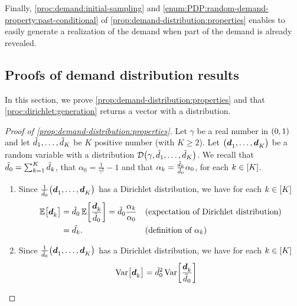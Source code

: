Finally, \cref{proc:demand:initial-sampling} and \cref{enum:PDP:random-demand-property:past-conditional} of \cref{prop:demand-distribution:properties} enables to easily generate a realization of the demand when part of the demand is already revealed.



\subsection{Proofs of demand distribution results}
\label{sec:PDP:numerical-experiments:instances:proofs}


In this section, we prove \cref{prop:demand-distribution:properties} and that \cref{proc:dirichlet:generation} returns a vector with a \distrib distribution.


\begin{proof}[Proof of \cref{prop:demand-distribution:properties}] 
Let $\gamma$ be a real number in $\bracket{0,1}$ and let $\tilde{d}_1,\ldots,\tilde{d}_K$ be $K$ positive number (with $K\ge2$).
Let $\bracket{\va\demand_1,\ldots,\va\demand_K}$ be a random variable with a \distrib distribution $\cD\bracket{\gamma,\tilde{\demand}_1,\ldots,\tilde{\demand}_K}$.
We recall that $\tilde{d}_0=\sum_{k=1}^K\tilde{d}_k$, that $\alpha_0=\frac{1}{\gamma^2}-1$ and that $\alpha_k=\frac{\tilde{d}_k}{\tilde{d}_0}\alpha_0$, for each $k\in\range{K}$.
\begin{enumerate}
\item Since $\frac{1}{\tilde{\demand}_0}\bracket{\va\demand_1,\ldots,\va\demand_K}$ has a Dirichlet distribution, we have for each $k\in\range{K}$
\begin{subequations}
\begin{align}
  \espe\sqbracket{\va\demand_k}
  &= \tilde{\demand}_0\espe\sqbracket{\frac{\va\demand_k}{\tilde{\demand}_0}}
  = \tilde{\demand}_0
  \frac{\alpha_k}{\alpha_0}
  && \mbox{(expectation of Dirichlet distribution)}
  \\
  &= \tilde{\demand_k}.
  && \mbox{(definition of $\alpha_k$)}
\end{align}
\end{subequations}
\item Since $\frac{1}{\tilde{\demand}_0}\bracket{\va\demand_1,\ldots,\va\demand_K}$ has a Dirichlet distribution, we have for each $k\in\range{K}$
\begin{subequations}
\begin{align}
  \vari\sqbracket{\va\demand_k}
  &= \tilde{\demand}_0^2\vari\sqbracket{\frac{\va\demand_k}{\tilde{\demand}_0}}

\end{align}
\end{subequations}
\end{enumerate}
\end{proof}

